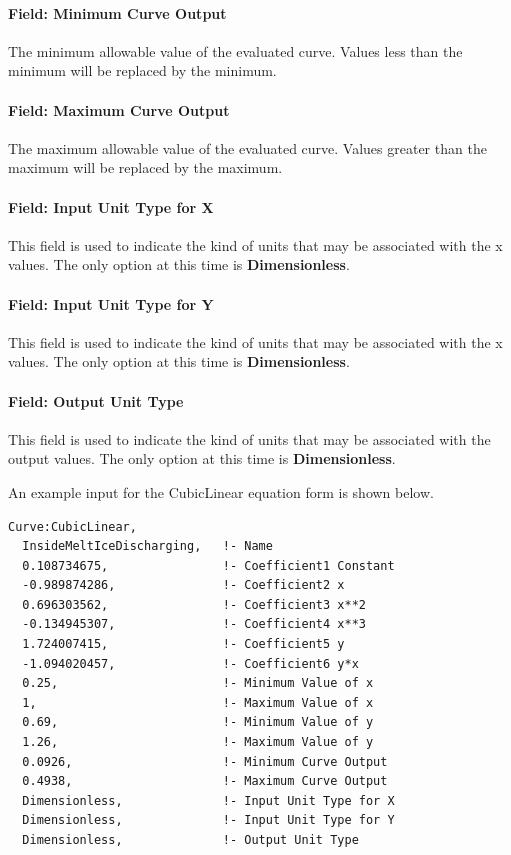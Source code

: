 \paragraph{Field: Minimum Curve Output}\label{field-minimum-curve-output-7}

The minimum allowable value of the evaluated curve. Values less than the minimum will be replaced by the minimum.

\paragraph{Field: Maximum Curve Output}\label{field-maximum-curve-output-6}

The maximum allowable value of the evaluated curve. Values greater than the maximum will be replaced by the maximum.

\paragraph{Field: Input Unit Type for X}\label{field-input-unit-type-for-x-8}

This field is used to indicate the kind of units that may be associated with the x values. The only option at this time is \textbf{Dimensionless}.

\paragraph{Field: Input Unit Type for Y}\label{field-input-unit-type-for-y-3}

This field is used to indicate the kind of units that may be associated with the x values. The only option at this time is \textbf{Dimensionless}.

\paragraph{Field: Output Unit Type}\label{field-output-unit-type-7}

This field is used to indicate the kind of units that may be associated with the output values. The only option at this time is \textbf{Dimensionless}.

An example input for the CubicLinear equation form is shown below.

\begin{lstlisting}
Curve:CubicLinear,
  InsideMeltIceDischarging,   !- Name
  0.108734675,                !- Coefficient1 Constant
  -0.989874286,               !- Coefficient2 x
  0.696303562,                !- Coefficient3 x**2
  -0.134945307,               !- Coefficient4 x**3
  1.724007415,                !- Coefficient5 y
  -1.094020457,               !- Coefficient6 y*x
  0.25,                       !- Minimum Value of x
  1,                          !- Maximum Value of x
  0.69,                       !- Minimum Value of y
  1.26,                       !- Maximum Value of y
  0.0926,                     !- Minimum Curve Output
  0.4938,                     !- Maximum Curve Output
  Dimensionless,              !- Input Unit Type for X
  Dimensionless,              !- Input Unit Type for Y
  Dimensionless,              !- Output Unit Type
\end{lstlisting}

